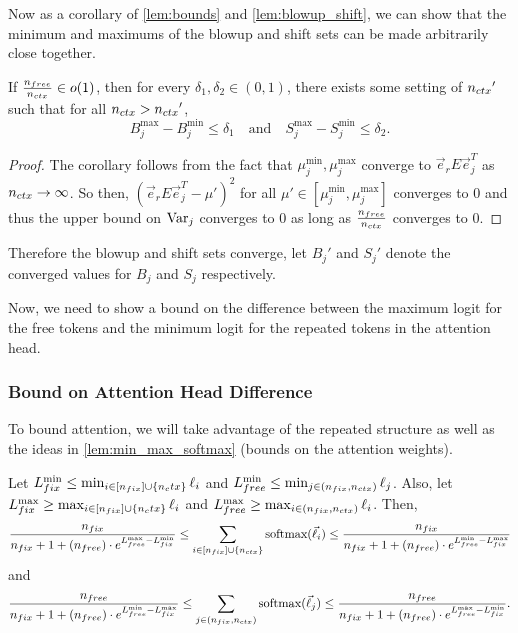 Now as a corollary of \cref{lem:bounds} and \cref{lem:blowup_shift}, we can show that the minimum and maximums of the blowup and shift sets can be made arbitrarily close together.
\begin{corollary}
	If $\frac{n_{free}}{{n_{ctx}}} \in o(1)$, then for every $\delta_1, \delta_2 \in (0, 1)$, there exists some setting of ${n_{ctx}}'$ such that for all ${n_{ctx}} > {n_{ctx}}'$,
	\[
		B_j^{\max} - B_j^{\min} \leq \delta_1 \quad \text{and} \quad S_j^{\max} - S_j^{\min} \leq \delta_2.
	\]
\end{corollary}
\begin{proof}[Proof]
    The corollary follows from the fact that $\mu_j^{\min}, \mu_j^{\max}$ converge to $\vec{e}_r E \vec{e}_j^T$ as ${n_{ctx}} \rightarrow \infty$.
    So then, $(\vec{e}_r E \vec{e}_j^T - \mu')^2$ for all $\mu' \in [\mu_j^{\min}, \mu_j^{\max}]$ converges to $0$ and thus the upper bound on $\mathrm{Var}_j$ converges to $0$ as long as $\frac{n_{free}}{{n_{ctx}}}$ converges to $0$.
\end{proof}

Therefore the blowup and shift sets converge, let $B_j'$ and $S_j'$ denote the converged values for $B_j$ and $S_j$ respectively.

Now, we need to show a bound on the difference between the maximum logit for the free tokens and the minimum logit for the repeated tokens in the attention head.

\subsubsection*{Bound on Attention Head Difference}
To bound attention, we will take advantage of the repeated structure as well as the ideas in \cref{lem:min_max_softmax} (bounds on the attention weights).

\begin{corollary}
	\label{cor:sum_attention}
	Let $L_{fix}^{\min} \leq \min_{i \in [n_{fix}] \cup \{n_ctx\}} \ell_i$ and $L_{free}^{\min} \leq \min_{j \in (n_{fix}, {n_{ctx}})} \ell_j$.
	Also, let $L_{fix}^{\max} \geq \max_{i \in [n_{fix}] \cup \{n_ctx\}} \ell_i$ and $L_{free}^{\max} \geq \max_{i \in (n_{fix}, {n_{ctx}})} \ell_i$. Then,
	\begin{align*}
	\frac{n_{fix}}{n_{fix} + 1 + (n_{free}) \cdot e^{L_{free}^{\max} - L_{fix}^{\min}}} 
\leq 
		\sum_{i \in [n_{fix}] \cup \{{n_{ctx}}\}} \text{softmax}(\vec{\ell}_i)
	\leq
		\frac{n_{fix}}{n_{fix} + 1 + (n_{free}) \cdot e^{L_{free}^{\min} - L_{fix}^{\max}}}
	\end{align*}
	and 
	\begin{align*}
		\frac{n_{free}}{n_{fix} + 1 + (n_{free}) \cdot e^{L_{free}^{\min} - L_{fix}^{\max}}} 
        \leq \sum_{j \in (n_{fix}, {n_{ctx}})} \text{softmax}(\vec{\ell}_j)
        \leq \frac{n_{free}}{n_{fix} + 1 + (n_{free}) \cdot e^{L_{free}^{\max} - L_{fix}^{\min}}}.
	\end{align*}
\end{corollary}

